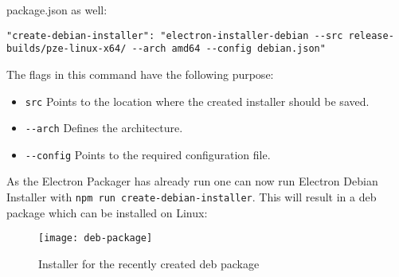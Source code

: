 package.json as well:
\begin{lstlisting}[caption=Configuration for debian package: debian.json]
"create-debian-installer": "electron-installer-debian --src release-builds/pze-linux-x64/ --arch amd64 --config debian.json"
\end{lstlisting}
The flags in this command have the following purpose:
\begin{itemize}
    \item \lstinline[columns=fixed]{src} Points to the location where the created installer should be saved.
    \item \lstinline[columns=fixed]{--arch} Defines the architecture.
    \item \lstinline[columns=fixed]{--config} Points to the required configuration file.
\end{itemize}
As the Electron Packager has already run one can now run Electron Debian Installer with 
\lstinline[columns=fixed]{npm run create-debian-installer}.
This will result in a \acrshort{deb} package which can be installed on Linux:
\begin{figure}[H]
    \centering
    \label{fig:pze-deb-package}
    \texttt{[image: deb-package]}
    \caption{Installer for the recently created \acrshort{deb} package}
\end{figure}
